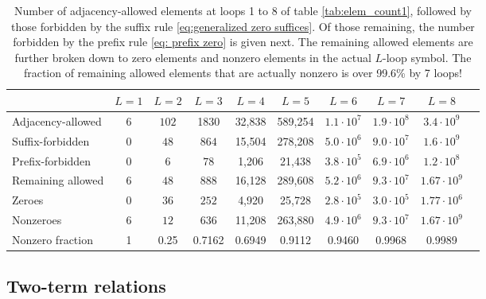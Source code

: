\documentclass[12pt]{article}
\begin{document}
\begin{table}[t]
    \small
    \centering
    \begin{tabular}{lccccccccc}
        \toprule
        & $L=1$ & $L=2$ & $L=3$ & $L=4$ & $L=5$ & $L=6$ & $L=7$ & $L=8$  \\
        \midrule
        Adjacency-allowed & $6$ & $102$ & 1830 & 32,838 & 589,254 & $1.1\cdot 10^7$ & $1.9\cdot 10^8$ & $3.4\cdot 10^9 $\\
        Suffix-forbidden & $0$ & $48$ & $864$ & 15,504 & 278,208 & $5.0\cdot 10^6$ & $9.0 \cdot 10^7$ & $1.6 \cdot 10^{9}$ \\
        Prefix-forbidden & $0$ & $6$ & $78$ & 1,206 & 21,438 & $3.8\cdot 10^5$ & $6.9\cdot 10^6$ & $1.2\cdot 10^8$ \\
        \midrule
        Remaining allowed & $6$ & $48$ & $888$ & 16,128 & 289,608 & $5.2\cdot 10^6$ & $9.3\cdot 10^7$ & $1.67\cdot 10^9$  \\
        Zeroes & $0$ & $36$ & $252$ & 4,920 & 25,728 & $2.8 \cdot 10^5$ & $3.0 \cdot 10^5$ & $1.77 \cdot 10^6$  \\
        Nonzeroes & $6$ & $12$ & $636$ & 11,208 & 263,880 & $4.9\cdot 10^6$ & $9.3\cdot 10^7$ & $1.67\cdot 10^9$\\
       \bottomrule
       Nonzero fraction & 1 & 0.25 & 0.7162 & 0.6949 & 0.9112 & 0.9460 & 0.9968 & 0.9989 \\
       \bottomrule
    \end{tabular}
    \caption{\small 
    Number of adjacency-allowed elements at loops 1 to 8 of table \ref{tab:elem_count1}, followed by those forbidden by the suffix rule \eqref{eq:generalized zero suffices}. Of those remaining, the number forbidden by the prefix rule \eqref{eq: prefix zero} is given next. The remaining allowed elements are further broken down to zero elements and nonzero elements in the actual $L$-loop symbol.  The fraction of remaining allowed elements that are actually nonzero is over 99.6\% by 7 loops!
    }
    \label{tab:elem_count}
\end{table}

\subsection{Two-term relations}
\label{sec:twoterm}
\end{document}
